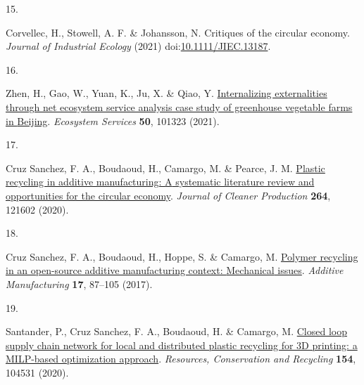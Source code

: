 \documentclass[
  11pt,
  a4paperpaper,
  onecolumn]{article}
\newlength{\cslhangindent}
\newlength{\csllabelwidth}
\newenvironment{CSLReferences}[2] %
 {\begin{list}{}{%
  \setlength{\itemindent}{0pt}
  \setlength{\leftmargin}{0pt}
  \setlength{\parsep}{0pt}
  \ifodd #1
   \setlength{\leftmargin}{\cslhangindent}
   \setlength{\itemindent}{-1\cslhangindent}
  \fi
  \setlength{\itemsep}{#2\baselineskip}}}
 {\end{list}}
\newcommand{\CSLLeftMargin}[1]{\parbox[t]{\csllabelwidth}{\strut#1\strut}}
\newcommand{\CSLRightInline}[1]{\parbox[t]{\linewidth - \csllabelwidth}{\strut#1\strut}}
\begin{document}
\begin{CSLReferences}{0}{0}
\CSLLeftMargin{15. }%
\CSLRightInline{Corvellec, H., Stowell, A. F. \& Johansson, N. Critiques
of the circular economy. \emph{Journal of Industrial Ecology} (2021)
doi:\href{https://doi.org/10.1111/JIEC.13187}{10.1111/JIEC.13187}.}

\CSLLeftMargin{16. }%
\CSLRightInline{Zhen, H., Gao, W., Yuan, K., Ju, X. \& Qiao, Y.
\href{https://doi.org/10.1016/j.ecoser.2021.101323}{Internalizing
externalities through net ecosystem service analysis\textendash{{A}}
case study of greenhouse vegetable farms in {Beijing}}. \emph{Ecosystem
Services} \textbf{50}, 101323 (2021).}

\CSLLeftMargin{17. }%
\CSLRightInline{Cruz Sanchez, F. A., Boudaoud, H., Camargo, M. \&
Pearce, J. M.
\href{https://doi.org/10.1016/j.jclepro.2020.121602}{Plastic recycling
in additive manufacturing: {A} systematic literature review and
opportunities for the circular economy}. \emph{Journal of Cleaner
Production} \textbf{264}, 121602 (2020).}

\CSLLeftMargin{18. }%
\CSLRightInline{Cruz Sanchez, F. A., Boudaoud, H., Hoppe, S. \& Camargo,
M. \href{https://doi.org/10.1016/j.addma.2017.05.013}{Polymer recycling
in an open-source additive manufacturing context: {Mechanical} issues}.
\emph{Additive Manufacturing} \textbf{17}, 87--105 (2017).}

\CSLLeftMargin{19. }%
\CSLRightInline{Santander, P., Cruz Sanchez, F. A., Boudaoud, H. \&
Camargo, M.
\href{https://doi.org/10.1016/j.resconrec.2019.104531}{{Closed loop
supply chain network for local and distributed plastic recycling for 3D
printing: a MILP-based optimization approach}}. \emph{Resources,
Conservation and Recycling} \textbf{154}, 104531 (2020).}

\end{CSLReferences}
\end{document}
